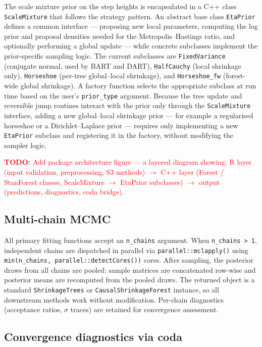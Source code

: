 The scale mixture prior on the step heights is encapsulated in a C++ class \texttt{ScaleMixture} that follows the strategy pattern. An abstract base class \texttt{EtaPrior} defines a common interface --- proposing new local parameters, computing the log prior and proposal densities needed for the Metropolis--Hastings ratio, and optionally performing a global update --- while concrete subclasses implement the prior-specific sampling logic. The current subclasses are \texttt{FixedVariance} (conjugate normal, used by BART and DART), \texttt{HalfCauchy} (local shrinkage only), \texttt{Horseshoe} (per-tree global--local shrinkage), and \texttt{Horseshoe\_fw} (forest-wide global shrinkage). A factory function selects the appropriate subclass at run time based on the user's \texttt{prior\_type} argument. Because the tree update and reversible jump routines interact with the prior only through the \texttt{ScaleMixture} interface, adding a new global--local shrinkage prior --- for example a regularised horseshoe or a Dirichlet--Laplace prior --- requires only implementing a new \texttt{EtaPrior} subclass and registering it in the factory, without modifying the sampler logic.

\textcolor{red}{\textbf{TODO:} Add package architecture figure — a layered diagram showing: R layer (input validation, preprocessing, S3 methods) $\to$ C++ layer (Forest / StanForest classes, ScaleMixture $\to$ EtaPrior subclasses) $\to$ output (predictions, diagnostics, coda bridge).}

\subsection{Multi-chain MCMC}\label{multi-chain-mcmc}

All primary fitting functions accept an \texttt{n\_chains} argument. When \texttt{n\_chains\ \textgreater{}\ 1}, independent chains are dispatched in parallel via \texttt{parallel::mclapply()} using \texttt{min(n\_chains,\ parallel::detectCores())} cores. After sampling, the posterior draws from all chains are pooled: sample matrices are concatenated row-wise and posterior means are recomputed from the pooled draws. The returned object is a standard \texttt{ShrinkageTrees} or \texttt{CausalShrinkageForest} instance, so all downstream methods work without modification. Per-chain diagnostics (acceptance ratios, \(\sigma\) traces) are retained for convergence assessment.

\subsection{Convergence diagnostics via coda}\label{convergence-diagnostics-via-coda}

